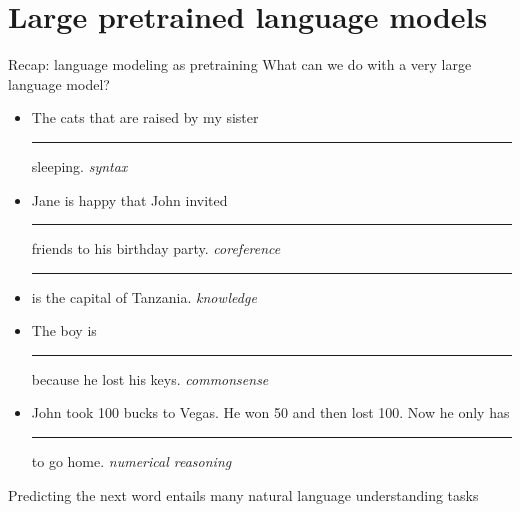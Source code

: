 \documentclass[usenames,dvipsnames,notes,11pt,aspectratio=169,hyperref={colorlinks=true, linkcolor=blue}]{beamer}
\begin{document}

\section{Large pretrained language models}
\begin{frame}
    {Recap: language modeling as pretraining}
    What can we do with a very large language model?
    \begin{itemize}
        \itemsep1em
        \item The cats that are raised by my sister \rule{1.5cm}{0.5mm} sleeping. \hfill \textit{syntax}
        \item Jane is happy that John invited \rule{1.5cm}{0.5mm} friends to his birthday party. \hfill \textit{coreference}
        \item \rule{1.5cm}{0.5mm} is the capital of Tanzania. \hfill \textit{knowledge}
        \item The boy is \rule{1.5cm}{0.5mm} because he lost his keys.  \hfill \textit{commonsense}
        \item John took 100 bucks to Vegas. He won 50 and then lost 100. Now he only has \rule{1.5cm}{0.5mm} to go home. \hfill \textit{numerical reasoning}
    \end{itemize}
    Predicting the next word entails many natural language understanding tasks
\end{frame}
\end{document}

